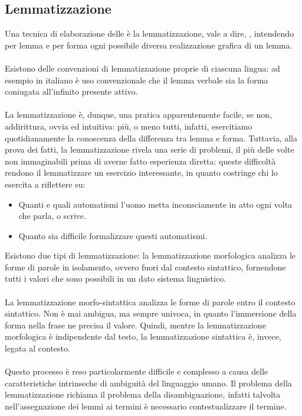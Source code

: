 \documentclass{article}
\theoremstyle{plain}
\theoremstyle{definition}
\begin{document}
\subsection{Lemmatizzazione}
Una tecnica di elaborazione delle  è la lemmatizzazione, vale a dire, , intendendo per lemma  e per forma ogni possibile diversa realizzazione grafica di un lemma.\footnotemark
{}
\\
\\
Esistono delle convenzioni di lemmatizzazione proprie di ciascuna lingua: ad esempio in italiano è uso convenzionale che il lemma verbale sia la forma coniugata all'infinito presente attivo.
\\
\\
La lemmatizzazione è, dunque, una pratica apparentemente facile, se non, addirittura, ovvia ed intuitiva: più, o meno tutti, infatti, esercitiamo quotidianamente la conoscenza della differenza tra lemma e forma. Tuttavia, alla prova dei fatti, la lemmatizzazione rivela una serie di problemi, il più delle volte non immaginabili prima di averne fatto esperienza diretta: queste difficoltà rendono il lemmatizzare un esercizio interessante, in quanto costringe chi lo esercita a riflettere su:

\begin{itemize}  
\item Quanti e quali automatismi l'uomo metta inconsciamente in atto ogni volta che parla, o scrive.
\item Quanto sia difficile formalizzare questi automatismi.
\end{itemize}
Esistono due tipi di lemmatizzazione: la lemmatizzazione morfologica analizza le forme di parole in isolamento, ovvero fuori dal contesto sintattico, fornendone tutti i valori che sono possibili in un dato sistema linguistico. 
\\
\\
La lemmatizzazione morfo-sintattica analizza le forme di parole entro il contesto sintattico. Non è mai ambigua, ma sempre univoca, in quanto l'immersione della forma nella frase ne precisa il valore. Quindi, mentre la lemmatizzazione morfologica è indipendente dal testo, la lemmatizzazione sintattica è, invece, legata al contesto.
\\
\\
Questo processo è reso particolarmente difficile e complesso a causa delle caratteristiche intrinseche di ambiguità del linguaggio umano. Il problema della lemmatizzazione richiama il problema della disambiguazione, infatti talvolta nell'assegnazione dei lemmi ai termini è necessario contestualizzare il termine.
\end{document}

